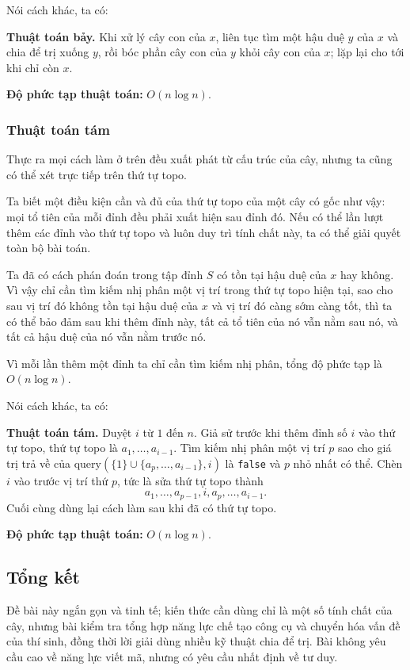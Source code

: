 \documentclass[11pt]{article}
\begin{document}
Nói cách khác, ta có:

\textbf{Thuật toán bảy.} Khi xử lý cây con của \(x\), liên tục tìm một hậu duệ
\(y\) của \(x\) và chia để trị xuống \(y\), rồi bóc phần cây con của \(y\) khỏi
cây con của \(x\); lặp lại cho tới khi chỉ còn \(x\).

\textbf{Độ phức tạp thuật toán:} \(O(n\log n)\).

\subsubsection{Thuật toán tám}

Thực ra mọi cách làm ở trên đều xuất phát từ cấu trúc của cây, nhưng ta cũng có
thể xét trực tiếp trên thứ tự topo.

Ta biết một điều kiện cần và đủ của thứ tự topo của một cây có gốc như vậy: mọi
tổ tiên của mỗi đỉnh đều phải xuất hiện sau đỉnh đó. Nếu có thể lần lượt thêm
các đỉnh vào thứ tự topo và luôn duy trì tính chất này, ta có thể giải quyết
toàn bộ bài toán.

Ta đã có cách phán đoán trong tập đỉnh \(S\) có tồn tại hậu duệ của \(x\) hay
không. Vì vậy chỉ cần tìm kiếm nhị phân một vị trí trong thứ tự topo hiện tại,
sao cho sau vị trí đó không tồn tại hậu duệ của \(x\) và vị trí đó càng sớm càng
tốt, thì ta có thể bảo đảm sau khi thêm đỉnh này, tất cả tổ tiên của nó vẫn nằm
sau nó, và tất cả hậu duệ của nó vẫn nằm trước nó.

Vì mỗi lần thêm một đỉnh ta chỉ cần tìm kiếm nhị phân, tổng độ phức tạp là
\(O(n\log n)\).

Nói cách khác, ta có:

\textbf{Thuật toán tám.} Duyệt \(i\) từ \(1\) đến \(n\). Giả sử trước khi thêm
đỉnh số \(i\) vào thứ tự topo, thứ tự topo là \(a_1,\ldots,a_{i-1}\). Tìm kiếm
nhị phân một vị trí \(p\) sao cho giá trị trả về của
\(\mathrm{query}(\{1\}\cup\{a_p,\ldots,a_{i-1}\},i)\) là \texttt{false} và \(p\)
nhỏ nhất có thể. Chèn \(i\) vào trước vị trí thứ \(p\), tức là sửa thứ tự topo
thành
\[
  a_1,\ldots,a_{p-1}, i, a_p,\ldots,a_{i-1}.
\]
Cuối cùng dùng lại cách làm sau khi đã có thứ tự topo.

\textbf{Độ phức tạp thuật toán:} \(O(n\log n)\).

\subsection{Tổng kết}

Đề bài này ngắn gọn và tinh tế; kiến thức cần dùng chỉ là một số tính chất của
cây, nhưng bài kiểm tra tổng hợp năng lực chế tạo công cụ và chuyển hóa vấn đề
của thí sinh, đồng thời lời giải dùng nhiều kỹ thuật chia để trị. Bài không yêu
cầu cao về năng lực viết mã, nhưng có yêu cầu nhất định về tư duy.
\end{document}
